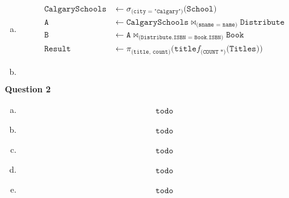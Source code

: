 \documentclass[11pt]{article}
\def\code#1{\texttt{#1}}
\def\select#1#2{\sigma_{\code{(#1)}} \code{(#2)}}
\def\join#1#2#3{\code{#1} \bowtie_{\code{(#2)}} \code{#3}}
\def\fun#1#2{f_{\code{(#1)}}{\code{(#2)}}}
\def\fun#1#2#3{\code{#1}f_{\code{(#2)}}{\code{(#3)}}}
\begin{document}
\begin{enumerate}[a.]
    \item
      \begin{equation*}
      \begin{aligned}
        \code{CalgarySchools} &\leftarrow \select{city = "Calgary"}{School} \\
        \code{A} &\leftarrow \join{CalgarySchools}{sname = name}{Distribute} \\
        \code{B} &\leftarrow \join{A}{Distribute.ISBN = Book.ISBN}{Book} \\
        \code{Result} &\leftarrow \pi_{\code{(title, count)}} \code{(}\fun{title}{COUNT *}{Titles}\code{)}
      \end{aligned}
      \end{equation*}

    \item
      \begin{equation*}
      \begin{aligned}
        \code{}
      \end{aligned}
      \end{equation*}
  \end{enumerate}


\item[] \textbf{Question 2}

  \begin{enumerate}[a.]

    \item
      \begin{equation*}
      \begin{aligned}
				\code{todo}
      \end{aligned}
      \end{equation*}

    \item 
      \begin{equation*}
      \begin{aligned}
				\code{todo}
      \end{aligned}
      \end{equation*}

    \item
      \begin{equation*}
      \begin{aligned}
				\code{todo}
      \end{aligned}
      \end{equation*}

    \item
      \begin{equation*}
      \begin{aligned}
				\code{todo}
      \end{aligned}
      \end{equation*}

    \item
      \begin{equation*}
      \begin{aligned}
				\code{todo}
      \end{aligned}
      \end{equation*}

  \end{enumerate}
\end{document}
